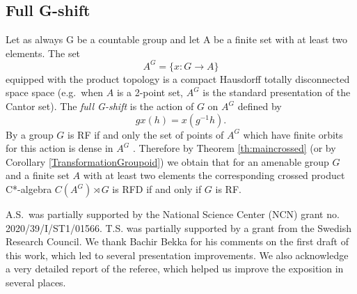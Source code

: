 \documentclass[11 pt, leqno, hidelinks]{amsart}%
\theoremstyle{plain}
\numberwithin{equation}{section}
\begin{document}
\medskip

\subsection{Full G-shift}



Let as always G be a countable group  and let A be a finite set with at least two elements. The set $$A^G = \{x: G\to A\}$$
equipped with the product topology is a compact Hausdorff totally disconnected space space  \cite{Ceccherini} (e.g.\ when $A$ is a 2-point set, $A^G$ is the standard presentation of the Cantor set).     The {\it full G-shift} is the action of $G$ on $A^G$ defined by
$$gx(h) = x(g^{-1}h).$$
 By \cite[Th. 2.7.1]{Ceccherini} a group $G$ is RF if and only the set of points of $A^G$ which have finite orbits for this action  is dense in $A^G$ . Therefore by Theorem \ref{th:maincrossed} (or by Corollary  \ref{TransformationGroupoid}) we obtain
that for an amenable group $G$ and a finite set $A$ with at least two elements the corresponding crossed product C*-algebra $C(A^G)\rtimes G$ is RFD if and only if $G$ is RF.



\medskip

A.S.\ was  partially supported by the National Science Center (NCN) grant no. 2020/39/I/ST1/01566. T.S. was partially supported by a grant from the Swedish Research Council. We thank Bachir Bekka for his comments on the first draft of this work, which led to several presentation improvements. We also acknowledge a very detailed report of the referee, which helped us improve the exposition in several places.




\end{document}
